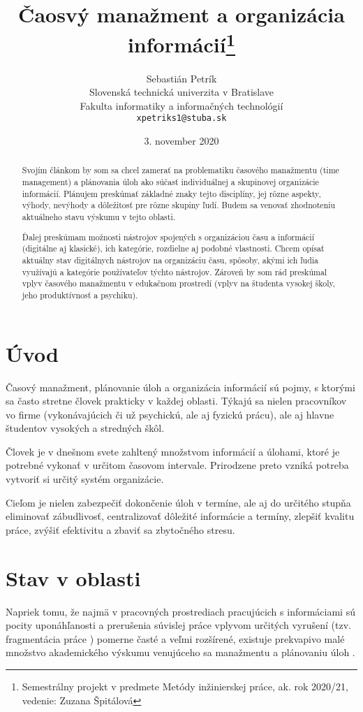 \documentclass[10pt,slovak,a4paper]{article}
\title{Čaosvý manažment a organizácia informácií\thanks{Semestrálny projekt v predmete Metódy inžinierskej práce, ak. rok 2020/21, vedenie: Zuzana Špitálová}}
\author{Sebastián Petrík\\[2pt]
	{\small Slovenská technická univerzita v Bratislave}\\
	{\small Fakulta informatiky a informačných technológií}\\
	{\small \texttt{xpetriks1@stuba.sk}}
	}
\date{\small 3. november 2020}
\begin{document}
\maketitle

\begin{abstract}
Svojím článkom by som sa chcel zamerať na problematiku časového manažmentu (time management) a plánovania úloh ako súčasť individuálnej a skupinovej organizácie informácií. Plánujem preskúmať základné znaky tejto disciplíny, jej rôzne aspekty, výhody, nevýhody a dôležitosť pre rôzne skupiny ľudí. Budem sa venovať zhodnoteniu aktuálneho stavu výskumu v tejto oblasti.

Ďalej preskúmam možnosti nástrojov spojených s organizáciou času a informácií (digitálne aj klasické), ich kategórie, rozdielne aj podobné vlastnosti. Chcem opísať aktuálny stav digitálnych nástrojov na organizáciu času, spôsoby, akými ich ľudia využívajú a kategórie používateľov týchto nástrojov. Zároveň by som rád preskúmal vplyv časového manažmentu v edukačnom prostredí (vplyv na študenta vysokej školy, jeho produktívnosť a psychiku).

\end{abstract}
\newpage

\section{Úvod}

	Časový manažment, plánovanie úloh a organizácia informácií sú pojmy, s ktorými sa často stretne človek prakticky v každej oblasti. Týkajú sa nielen pracovníkov vo firme (vykonávajúcich či už psychickú, ale aj fyzickú prácu), ale aj hlavne študentov vysokých a stredných škôl.
	
	Človek je v dnešnom svete zahltený množstvom informácií a úlohami, ktoré je potrebné vykonať v určitom časovom intervale. Prirodzene preto vzniká potreba vytvoriť si určitý systém organizácie.
	
	Cieľom je nielen zabezpečiť dokončenie úloh v termíne, ale aj do určitého stupňa eliminovať zábudlivosť, centralizovať dôležité informácie a termíny, zlepšiť kvalitu práce, zvýšiť efektivitu a zbaviť sa zbytočného stresu.
	
\section{Stav v oblasti}
	
	Napriek tomu, že najmä v pracovných prostrediach pracujúcich s informáciami sú pocity uponáhľanosti a prerušenia súvislej práce vplyvom určitých vyrušení (tzv. fragmentácia práce \cite{NoTask}) pomerne časté a veľmi rozšírené, existuje prekvapivo malé množstvo akademického výskumu venujúceho sa manažmentu a plánovaniu úloh \cite{Franssila}. 
	
\end{document}
